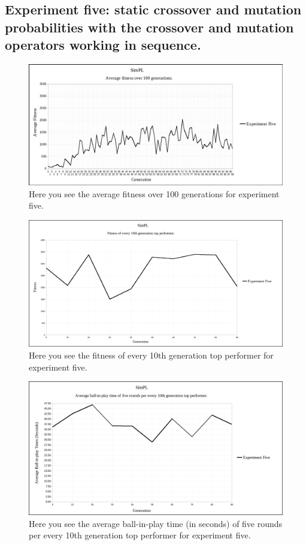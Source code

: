 \documentclass[a4paper,10pt]{article}
\begin{document}
\subsection{Experiment five: static crossover and mutation probabilities with the crossover and mutation operators working in sequence.}

\begin{figure}[H]  
  \centering
  \includegraphics[width=1\textwidth]{figures/exp5_avg_fit.png}
  \caption{Here you see the average fitness over 100 generations for experiment five.}
  \label{fig:exp5_avg_fit}
\end{figure}

\begin{figure}[H]  
  \centering
  \includegraphics[width=1\textwidth]{figures/exp5_10_tops.png}
  \caption{Here you see the fitness of every 10th generation top performer for experiment five.}
  \label{fig:exp5_10_tops}
\end{figure}

\begin{figure}[H]  
  \centering
  \includegraphics[width=1\textwidth]{figures/exp5_10_tops_times.png}
  \caption{Here you see the average ball-in-play time (in seconds) of five rounds per every 10th generation top performer for experiment five.}
  \label{fig:exp5_10_tops_times}
\end{figure}
\end{document}
